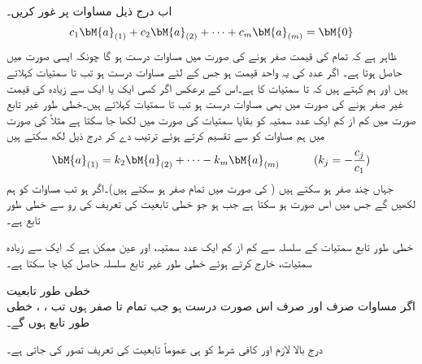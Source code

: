 اب درج ذیل مساوات پر غور کریں۔
\begin{align}\label{مساوات_الجبرا_غیر_تابعیت_الف}
c_1\bM{a}_{(1)}+c_2\bM{a}_{(2)}+\cdots+c_m\bM{a}_{(m)}=\bM{0}
\end{align}
ظاہر ہے کہ تمام  کی قیمت صفر ہونے کی صورت میں مساوات  درست ہو گا چونکہ ایسی صورت میں  حاصل ہوتا ہے۔ اگر  عدد  کی یہ واحد قیمت ہو جس کے لئے مساوات  درست ہو تب  تا  سمتیات  کہلاتے ہیں اور ہم کہتے ہیں کہ   تا  سمتیات کا  ہے۔اس کے برعکس اگر کسی ایک یا ایک سے زیادہ  کی قیمت غیر صفر ہونے کی صورت میں بھی مساوات  درست ہو تب  تا  سمتیات  کہلاتے ہیں۔خطی طور غیر تابع صورت میں کم از کم ایک عدد سمتیہ کو بقایا سمتیات کی صورت میں لکھا جا سکتا ہے مثلاً  کی صورت میں ہم مساوات  کو  سے تقسیم کرتے ہوئے ترتیب دے کر درج ذیل لکھ سکتے ہیں
\begin{align*}
\bM{a}_{(1)}=k_2\bM{a}_{(2)}+\cdots-k_m\bM{a}_{(m)}   \quad \quad\quad (k_j=-\frac{c_j}{c_1})
\end{align*}
جہاں چند  صفر ہو سکتے ہیں ( کی صورت میں تمام  صفر ہو سکتے ہیں)۔اگر  ہو تب  مساوات  کو ہم  لکھیں گے جس میں  اس صورت ہو سکتا ہے جب  ہو جو خطی تابعیت کی تعریف کی رو سے  خطی طور تابع ہے۔

خطی طور تابع سمتیات کے سلسلہ سے کم از کم ایک عدد سمتیہ، اور عین ممکن ہے کہ ایک سے زیادہ سمتیات، خارج کرتے ہوئے خطی طور غیر تابع سلسلہ حاصل کیا جا سکتا ہے۔

\quad خطی طور تابعیت\\
اگر مساوات  صرف اور صرف  اس صورت درست ہو جب تمام  تا  صفر ہوں تب ، ،  خطی طور تابع ہوں گے۔

درج بالا لازم  اور کافی شرط کو ہی عموماً تابعیت کی تعریف تصور کی جاتی ہے۔

